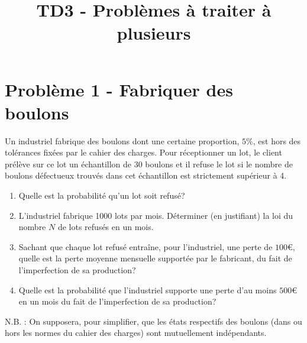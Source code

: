 \documentclass[10pt]{article}
\title{TD3 - Problèmes à traiter à plusieurs}
\author{}
\date{}
\begin{document}
\sffamily
\maketitle






\section*{Problème 1 - Fabriquer des boulons}
Un industriel fabrique des boulons dont une certaine proportion, $5 \%$, est hors des tolérances fixées par le cahier des charges. Pour réceptionner un lot, le client prélève sur ce lot un échantillon de 30 boulons et il refuse le lot si le nombre de boulons défectueux trouvés dans cet échantillon est strictement supérieur à 4.
\begin{enumerate}
    \item Quelle est la probabilité qu'un lot soit refusé?
    \item L'industriel fabrique 1000 lots par mois. Déterminer (en justifiant) la loi du nombre $N$ de lots refusés en un mois.
    \item Sachant que chaque lot refusé entraîne, pour l'industriel, une perte de $100 €$, quelle est la perte moyenne mensuelle supportée par le fabricant, du fait de l'imperfection de sa production?
    \item Quelle est la probabilité que l'industriel supporte une perte d'au moins $500 €$ en un mois du fait de l'imperfection de sa production?
\end{enumerate}
N.B. : On supposera, pour simplifier, que les états respectifs des boulons (dans ou hors les normes du cahier des charges) sont mutuellement indépendants.

\vspace{2cm}
\end{document}
